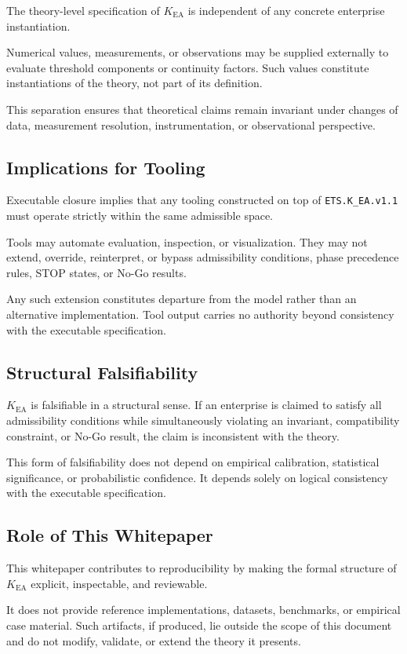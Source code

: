 The theory-level specification of $K_{\mathrm{EA}}$ is independent of
any concrete enterprise instantiation.

Numerical values, measurements, or observations may be supplied
externally to evaluate threshold components or continuity factors.
Such values constitute instantiations of the theory, not part of its
definition.

This separation ensures that theoretical claims remain invariant under
changes of data, measurement resolution, instrumentation, or
observational perspective.

\subsection{Implications for Tooling}

Executable closure implies that any tooling constructed on top of
\texttt{ETS.K\_EA.v1.1} must operate strictly within the same admissible
space.

Tools may automate evaluation, inspection, or visualization.
They may not extend, override, reinterpret, or bypass admissibility
conditions, phase precedence rules, STOP states, or No-Go results.

Any such extension constitutes departure from the model rather than an
alternative implementation.
Tool output carries no authority beyond consistency with the executable
specification.

\subsection{Structural Falsifiability}

$K_{\mathrm{EA}}$ is falsifiable in a structural sense.
If an enterprise is claimed to satisfy all admissibility conditions
while simultaneously violating an invariant, compatibility constraint,
or No-Go result, the claim is inconsistent with the theory.

This form of falsifiability does not depend on empirical calibration,
statistical significance, or probabilistic confidence.
It depends solely on logical consistency with the executable
specification.

\subsection{Role of This Whitepaper}

This whitepaper contributes to reproducibility by making the formal
structure of $K_{\mathrm{EA}}$ explicit, inspectable, and reviewable.

It does not provide reference implementations, datasets, benchmarks, or
empirical case material.
Such artifacts, if produced, lie outside the scope of this document and
do not modify, validate, or extend the theory it presents.

